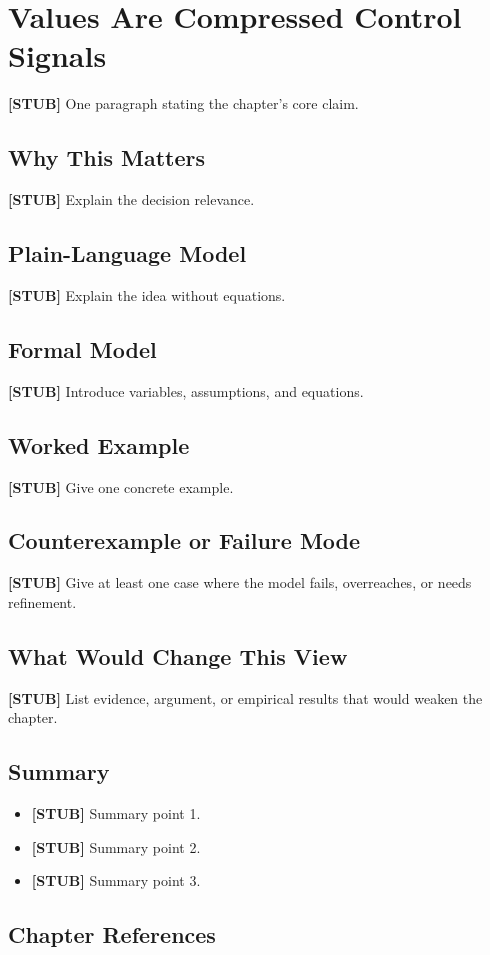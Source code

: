 \chapter{Values Are Compressed Control Signals}
\label{ch:values-compressed-control}

\begin{chapterthesis}
\textbf{[STUB]} One paragraph stating the chapter's core claim.
\end{chapterthesis}

\section{Why This Matters}

\textbf{[STUB]} Explain the decision relevance.

\section{Plain-Language Model}

\textbf{[STUB]} Explain the idea without equations.

\section{Formal Model}

\textbf{[STUB]} Introduce variables, assumptions, and equations.

\section{Worked Example}

\textbf{[STUB]} Give one concrete example.

\section{Counterexample or Failure Mode}

\textbf{[STUB]} Give at least one case where the model fails, overreaches, or needs refinement.

\section{What Would Change This View}

\textbf{[STUB]} List evidence, argument, or empirical results that would weaken the chapter.

\section{Summary}

\begin{itemize}
  \item \textbf{[STUB]} Summary point 1.
  \item \textbf{[STUB]} Summary point 2.
  \item \textbf{[STUB]} Summary point 3.
\end{itemize}

\section*{Chapter References}

